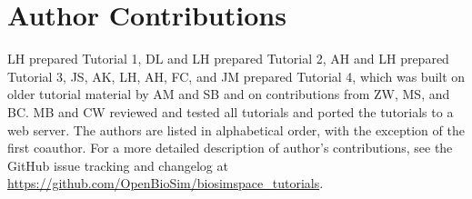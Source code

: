 \documentclass[9pt,tutorial,pubversion]{livecoms}
\newcommand{\githubrepository}{\url{https://github.com/OpenBioSim/biosimspace_tutorials}}  %
\begin{document}
%
%

%

\section{Author Contributions}
%
LH prepared Tutorial 1, DL and LH prepared Tutorial 2, AH and LH prepared Tutorial 3, JS, AK, LH, AH, FC, and JM prepared Tutorial 4, which was built on older tutorial material by AM and SB and on contributions from ZW, MS, and BC. MB and CW reviewed and tested all tutorials and ported the tutorials to a web server. The authors are listed in alphabetical order, with the exception of the first coauthor.
For a more detailed description of author's contributions,
see the GitHub issue tracking and changelog at \githubrepository.
\end{document}

